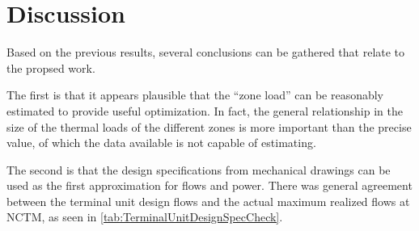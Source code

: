 \section{Discussion}

Based on the previous results, several conclusions can be gathered that relate to the propsed work.

The first is that it appears plausible that the ``zone load'' can be reasonably estimated to provide useful optimization. In fact, the general relationship in the size of the thermal loads of the different zones is more important than the precise value, of which the data available is not capable of estimating. 

The second is that the design specifications from mechanical drawings can be used as the first approximation for flows and power. There was general agreement between the terminal unit design flows and the actual maximum realized flows at NCTM, as seen in \tableref{} \ref{tab:TerminalUnitDesignSpecCheck}. 

